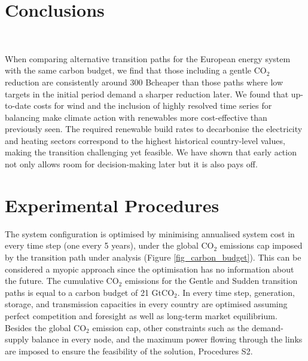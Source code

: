 \documentclass[5p]{elsarticle} %
\begin{document}
\section{Conclusions} \

When comparing alternative transition paths for the European energy system with the same carbon budget, we find that those including a gentle CO$_2$ reduction are consistently around 300 B\EUR cheaper than those paths where low targets in the initial period demand a sharper reduction later.  We found that up-to-date costs for wind and the inclusion of highly resolved time series for balancing make climate action with renewables more cost-effective than previously seen. The required renewable build rates to decarbonise the electricity and heating sectors correspond to the highest historical country-level values, making the transition challenging yet feasible. We have shown that early action not only allows room for decision-making later but it is also pays off.  



\FloatBarrier
\section{Experimental Procedures}

The system configuration is optimised by minimising annualised system cost in every time step (one every 5 years), under the global CO$_2$ emissions cap imposed by the transition path under analysis (Figure \ref{fig_carbon_budget}). This can be considered a myopic approach since the optimisation has no information about the future. The cumulative CO$_2$ emissions for the Gentle and Sudden transition paths is equal to a carbon budget of 21 GtCO$_2$. In every time step, generation, storage, and transmission capacities in every country are optimised assuming perfect competition and foresight as well as long-term market equilibrium. Besides the global CO$_2$ emission cap, other constraints such as the demand-supply balance in every node, and the maximum power flowing through the links are imposed to ensure the feasibility of the solution, Procedures S2. \
\end{document}
